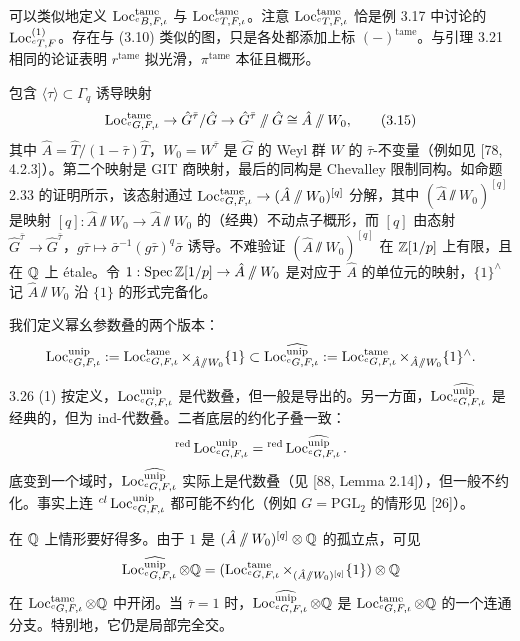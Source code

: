 可以类似地定义 $\operatorname{Loc}^{\mathrm{tame}}_{{}^{c}B,F,\iota}$ 与 $\operatorname{Loc}^{\mathrm{tame}}_{{}^{c}T,F,\iota}$。注意 $\operatorname{Loc}^{\mathrm{tame}}_{{}^{c}T,F,\iota}$ 恰是例 3.17 中讨论的 $\operatorname{Loc}^{(1)}_{{}^{c}T,F}$。存在与 (3.10) 类似的图，只是各处都添加上标 $(-)^{\mathrm{tame}}$。与引理 3.21 相同的论证表明 $r^{\mathrm{tame}}$ 拟光滑，$\pi^{\mathrm{tame}}$ 本征且概形。

包含 $\langle\tau\rangle\subset\Gamma_q$ 诱导映射
\begin{equation}
\operatorname{Loc}^{\mathrm{tame}}_{{}^{c}G,F,\iota}\to\hat G^{\bar\tau}/\hat G\to\hat G^{\bar\tau}\sslash\hat G\cong\hat A\sslash W_0, \tag{3.15}
\end{equation}
其中 $\hat A=\hat T/(1-\bar\tau)\hat T$，$W_0=W^{\bar\tau}$ 是 $\hat G$ 的 Weyl 群 $W$ 的 $\bar\tau$-不变量（例如见 [78, 4.2.3]）。第二个映射是 GIT 商映射，最后的同构是 Chevalley 限制同构。如命题 2.33 的证明所示，该态射通过 $\operatorname{Loc}^{\mathrm{tame}}_{{}^{c}G,F,\iota}\to(\hat A\sslash W_0)^{[q]}$ 分解，其中 $(\hat A\sslash W_0)^{[q]}$ 是映射 $[q]:\hat A\sslash W_0\to\hat A\sslash W_0$ 的（经典）不动点子概形，而 $[q]$ 由态射 $\hat G^{\bar\tau}\to\hat G^{\bar\tau}$，$g\bar\tau\mapsto\bar\sigma^{-1}(g\bar\tau)^{q}\bar\sigma$ 诱导。不难验证 $(\hat A\sslash W_0)^{[q]}$ 在 $\mathbb{Z}[1/p]$ 上有限，且在 $\mathbb{Q}$ 上 étale。令 $1:\operatorname{Spec}\mathbb{Z}[1/p]\to\hat A\sslash W_0$ 是对应于 $\hat A$ 的单位元的映射，$\{1\}^{\wedge}$ 记 $\hat A\sslash W_0$ 沿 $\{1\}$ 的形式完备化。

我们定义幂幺参数叠的两个版本：
\[
\operatorname{Loc}^{\mathrm{unip}}_{{}^{c}G,F,\iota}:=\operatorname{Loc}^{\mathrm{tame}}_{{}^{c}G,F,\iota}\times_{\hat A\sslash W_0}\{1\}\subset\operatorname{Loc}^{\widehat{\mathrm{unip}}}_{{}^{c}G,F,\iota}:=\operatorname{Loc}^{\mathrm{tame}}_{{}^{c}G,F,\iota}\times_{\hat A\sslash W_0}\{1\}^{\wedge}.
\]
\begin{rem}{3.26}
(1) 按定义，$\operatorname{Loc}^{\mathrm{unip}}_{{}^{c}G,F,\iota}$ 是代数叠，但一般是导出的。另一方面，$\operatorname{Loc}^{\widehat{\mathrm{unip}}}_{{}^{c}G,F,\iota}$ 是经典的，但为 ind-代数叠。二者底层的约化子叠一致：
\[
{}^{\mathrm{red}}\operatorname{Loc}^{\mathrm{unip}}_{{}^{c}G,F,\iota}={}^{\mathrm{red}}\operatorname{Loc}^{\widehat{\mathrm{unip}}}_{{}^{c}G,F,\iota}.
\]
底变到一个域时，$\operatorname{Loc}^{\widehat{\mathrm{unip}}}_{{}^{c}G,F,\iota}$ 实际上是代数叠（见 [88, Lemma 2.14]），但一般不约化。事实上连 ${}^{cl}\operatorname{Loc}^{\mathrm{unip}}_{{}^{c}G,F,\iota}$ 都可能不约化（例如 $G=\mathrm{PGL}_2$ 的情形见 [26]）。

在 $\mathbb{Q}$ 上情形要好得多。由于 $1$ 是 $(\hat A\sslash W_0)^{[q]}\otimes\mathbb{Q}$ 的孤立点，可见
\[
\operatorname{Loc}^{\widehat{\mathrm{unip}}}_{{}^{c}G,F,\iota}\otimes\mathbb{Q}=(\operatorname{Loc}^{\mathrm{tame}}_{{}^{c}G,F,\iota}\times_{(\hat A\sslash W_0)^{[q]}}\{1\})\otimes\mathbb{Q}
\]
在 $\operatorname{Loc}^{\mathrm{tame}}_{{}^{c}G,F,\iota}\otimes\mathbb{Q}$ 中开闭。当 $\bar\tau=1$ 时，$\operatorname{Loc}^{\widehat{\mathrm{unip}}}_{{}^{c}G,F,\iota}\otimes\mathbb{Q}$ 是 $\operatorname{Loc}^{\mathrm{tame}}_{{}^{c}G,F,\iota}\otimes\mathbb{Q}$ 的一个连通分支。特别地，它仍是局部完全交。
\end{rem}

